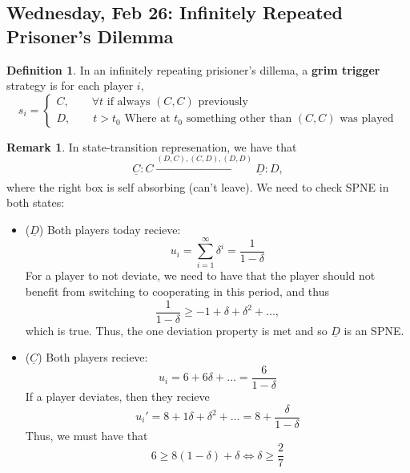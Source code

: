 \documentclass[10pt, oneside]{article}
\theoremstyle{definition}
\newtheorem{defn}{Definition}
\newtheorem{rem}{Remark}
\begin{document}
\subsection*{Wednesday, Feb 26: Infinitely Repeated Prisoner's Dilemma}
\begin{defn}
    In an infinitely repeating prisioner's dillema, a \textbf{grim trigger} strategy is for each player $i,$
    \[s_i = \begin{cases}
        C, \qquad \forall t \text{ if always $(C,C)$ previously}\\
        D, \qquad t>t_0 \text{ Where at $t_0$ something other than $(C,C)$ was played}
    \end{cases}\]
\end{defn}
\begin{rem}
    In state-transition represenation, we have that 
    \[\boxed{\underline{C}: C}\xrightarrow[]{(D,C), (C,D),(D,D)} \boxed{\underline{D}: D},\] where the right box is self absorbing (can't leave). We need to check SPNE in both states:
    \begin{itemize}
        \item ($\underline{D}$) Both players today recieve:
        \[u_i= \sum_{i=1}^\infty \delta^i = \frac{1}{1-\delta}\] For a player to not deviate, we need to have that the player should not benefit from switching to cooperating in this period, and thus
        \[\frac{1}{1-\delta} \geq -1  + \delta + \delta^2 + \dots,\] which is true. Thus, the one deviation property is met and so $\underline{D}$ is an SPNE.
        \item ($\underline{C}$) Both players recieve:
        \[u_i = 6 + 6\delta + \dots = \frac{6}{1-\delta}\] If a player deviates, then they recieve 
        \[u_i' = 8 + 1\delta + \delta^2 + \dots = 8 + \frac{\delta}{1-\delta}\] Thus, we must have that 
        \[6 \geq 8(1-\delta) + \delta \iff \delta \geq \frac{2}{7}\]
    \end{itemize}
\end{rem}
\end{document}
